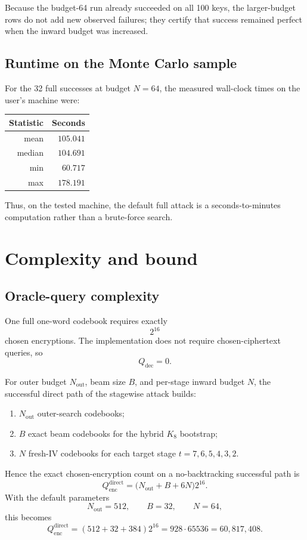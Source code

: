 \documentclass[11pt]{article}
\begin{document}
Because the budget-64 run already succeeded on all 100 keys, the larger-budget rows do not add new observed failures; they certify that success remained perfect when the inward budget was increased.

\subsection{Runtime on the Monte Carlo sample}
For the 32 full successes at budget $N=64$, the measured wall-clock times on the user's machine were:
\begin{center}
\begin{tabular}{rr}
\toprule
Statistic & Seconds \\
\midrule
mean   & $105.041$ \\
median & $104.691$ \\
min    & $60.717$ \\
max    & $178.191$ \\
\bottomrule
\end{tabular}
\end{center}
Thus, on the tested machine, the default full attack is a seconds-to-minutes computation rather than a brute-force search.

\section{Complexity and bound}
\subsection{Oracle-query complexity}
One full one-word codebook requires exactly
\[
2^{16}
\]
chosen encryptions. The implementation does not require chosen-ciphertext queries, so
\[
Q_{\mathrm{dec}}=0.
\]

For outer budget $N_{\mathrm{out}}$, beam size $B$, and per-stage inward budget $N$, the successful direct path of the stagewise attack builds:
\begin{enumerate}[label=\arabic*.,leftmargin=1.5em]
\item $N_{\mathrm{out}}$ outer-search codebooks;
\item $B$ exact beam codebooks for the hybrid $K_8$ bootstrap;
\item $N$ fresh-IV codebooks for each target stage $t=7,6,5,4,3,2$.
\end{enumerate}
Hence the exact chosen-encryption count on a no-backtracking successful path is
\begin{equation}
\label{eq:qenc-direct}
Q_{\mathrm{enc}}^{\mathrm{direct}}
=
\bigl(N_{\mathrm{out}}+B+6N\bigr)2^{16}.
\end{equation}
With the default parameters
\[
N_{\mathrm{out}}=512,\qquad B=32,\qquad N=64,
\]
this becomes
\[
Q_{\mathrm{enc}}^{\mathrm{direct}}
=(512+32+384)2^{16}
=928\cdot 65536
=60{,}817{,}408.
\]
\end{document}
